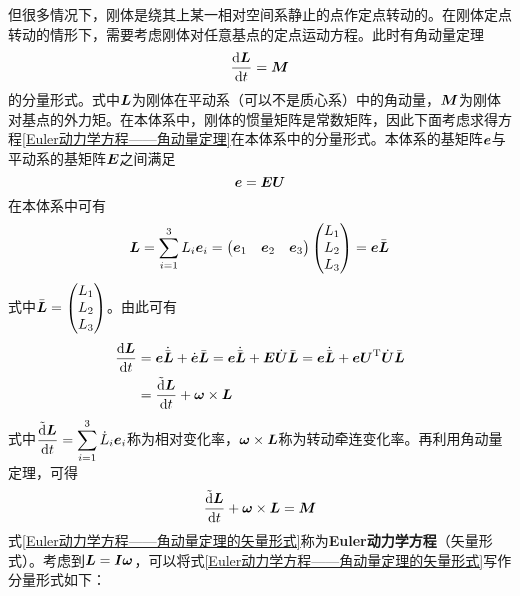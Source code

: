 但很多情况下，刚体是绕其上某一相对空间系静止的点作定点转动的。在刚体定点转动的情形下，需要考虑刚体对任意基点的定点运动方程。此时有角动量定理
\begin{equation}
	\frac{\mathrm{d} \boldsymbol{L}}{\mathrm{d} t} = \boldsymbol{M}
	\label{Euler动力学方程——角动量定理}
\end{equation}
的分量形式。式中$\boldsymbol{L}$为刚体在平动系（可以不是质心系）中的角动量，$\boldsymbol{M}$为刚体对基点的外力矩。在本体系中，刚体的惯量矩阵是常数矩阵，因此下面考虑求得方程\eqref{Euler动力学方程——角动量定理}在本体系中的分量形式。本体系的基矩阵$\boldsymbol{e}$与平动系的基矩阵$\boldsymbol{E}$之间满足
\begin{equation*}
	\boldsymbol{e} = \boldsymbol{E} \boldsymbol{U}
\end{equation*}
在本体系中可有
\begin{equation*}
	\boldsymbol{L} = \sum_{i=1}^3 L_i \boldsymbol{e}_i = \begin{pmatrix} \boldsymbol{e}_1 & \boldsymbol{e}_2 & \boldsymbol{e}_3 \end{pmatrix} \begin{pmatrix} L_1 \\ L_2 \\ L_3 \end{pmatrix} = \boldsymbol{e} \bar{\boldsymbol{L}}
\end{equation*}
式中$\bar{\boldsymbol{L}} = \begin{pmatrix} L_1 \\ L_2 \\ L_3 \end{pmatrix}$。由此可有
\begin{align}
	\frac{\mathrm{d} \boldsymbol{L}}{\mathrm{d} t} & = \boldsymbol{e} \dot{\bar{\boldsymbol{L}}} + \dot{\boldsymbol{e}} \bar{\boldsymbol{L}} = \boldsymbol{e} \dot{\bar{\boldsymbol{L}}} + \boldsymbol{E} \dot{\boldsymbol{U}} \bar{\boldsymbol{L}} = \boldsymbol{e} \dot{\bar{\boldsymbol{L}}} + \boldsymbol{e} \boldsymbol{U}^{\mathrm{T}} \dot{\boldsymbol{U}} \bar{\boldsymbol{L}} \nonumber \\
	& = \frac{\tilde{\mathrm{d}} \boldsymbol{L}}{\mathrm{d} t} + \boldsymbol{\omega} \times \boldsymbol{L}
\end{align}
式中$\displaystyle \frac{\tilde{\mathrm{d}} \boldsymbol{L}}{\mathrm{d} t} = \sum_{i=1}^3 \dot{L}_i \boldsymbol{e}_i$称为{\heiti 相对变化率}，$\boldsymbol{\omega} \times \boldsymbol{L}$称为{\heiti 转动牵连变化率}。再利用角动量定理，可得
\begin{equation}
	\frac{\tilde{\mathrm{d}} \boldsymbol{L}}{\mathrm{d} t} + \boldsymbol{\omega} \times \boldsymbol{L} = \boldsymbol{M}
	\label{Euler动力学方程——角动量定理的矢量形式}
\end{equation}
式\eqref{Euler动力学方程——角动量定理的矢量形式}称为{\bf Euler动力学方程}（矢量形式）。考虑到$\boldsymbol{L} = \boldsymbol{I} \boldsymbol{\omega}$，可以将式\eqref{Euler动力学方程——角动量定理的矢量形式}写作分量形式如下：
